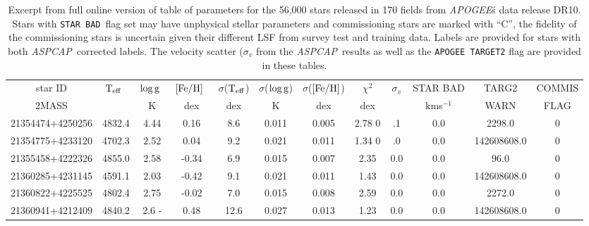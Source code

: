 \documentclass[12pt, preprint]{aastex}
\newcommand{\apogee}{\textsl{APOGEE}}
\newcommand{\aspcap}{\textsl{ASPCAP}}
\newcommand{\badstar}{\texttt{STAR BAD}}
\newcommand{\teff}{\mbox{$\rm T_{eff}$}}
\newcommand{\feh}{\mbox{$\rm [Fe/H]$}}
\newcommand{\logg}{\mbox{$\rm \log g$}}
\begin{document}
\begin{table}[!h]
\tiny{
\centering
\caption{Excerpt from full online version of table of parameters for the 56,000 stars released in 170 fields from \apogee\'s data release DR10. Stars with \badstar\ flag set may have unphysical stellar parameters and commissioning stars are marked with ``C'', the fidelity of the commissioning stars is uncertain given their different LSF from survey test and training data. Labels are provided for stars with both \aspcap\ corrected labels. The velocity scatter ($\sigma_v$ from the \aspcap\ results as well as the \texttt{APOGEE TARGET2} flag are provided in these tables.} 
\begin{tabular}{| c | c | c |  c | c | c |  c | c | c | c | c | c | } %
\hline
star ID  & \teff\ & \logg\ & \feh\ & $\sigma$(\teff) & $\sigma$(\logg) & $\sigma$(\feh) & $\chi^2$ & \tiny{$\sigma_{v}$} & \tiny{STAR BAD} & \tiny{TARG2}& \tiny{COMMIS} \\
{2MASS} &  & K &  dex  & dex & K & dex & dex & & kms$^{-1}$&  \tiny{WARN} & \tiny{ FLAG}  \\    
\hline
\tiny{21354474+4250256} & 4832.4  & 4.44  & 0.16  & 8.6  & 0.011  & 0.005  & 2.78 0 & .1  & 0.0  & 2298.0 &0 \\
\tiny{21354775+4233120} & 4702.3  & 2.52  & 0.04  & 9.2  & 0.021  & 0.011  & 1.34 0 & .0  & 0.0  & 142608608.0 & 0 \\
\tiny{21355458+4222326} & 4855.0  & 2.58  & -0.34 &  6.9 &  0.015 &  0.007 &  2.35  & 0.0 &  0.0 &  96.0 &  0 \\
\tiny{21360285+4231145} & 4591.1  & 2.03  & -0.42 &  9.1 &  0.021 &  0.011 &  1.43  & 0.0 &  0.0 &  142608608.0 &  0 \\
\tiny{21360822+4225525} & 4802.4  & 2.75  & -0.02 &  7.0 &  0.015 &  0.008 &  2.59  & 0.0 &  0.0 &  2272.0 &  0 \\
\tiny{21360941+4212409} & 4840.2  & 2.6 - & 0.48  & 12.6 &  0.027 &  0.013 &  1.23  & 0.0 &  0.0 &  142608608.0 &  0 \\
 \hline
\end{tabular}
\label{tab:online} }
\end{table}  
 
\end{document}
